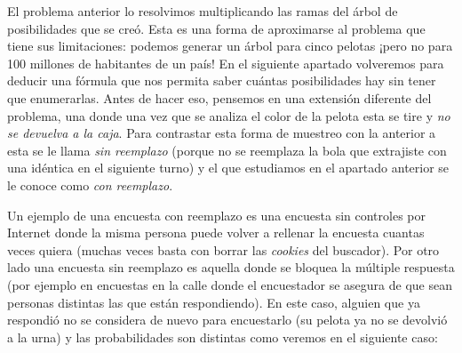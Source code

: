 \documentclass[
]{book}
\begin{document}
El problema anterior lo resolvimos multiplicando las ramas del árbol de posibilidades que se creó. Esta es una forma de aproximarse al problema que tiene sus limitaciones: podemos generar un árbol para cinco pelotas ¡pero no para 100 millones de habitantes de un país! En el siguiente apartado volveremos para deducir una fórmula que nos permita saber cuántas posibilidades hay sin tener que enumerarlas. Antes de hacer eso, pensemos en una extensión diferente del problema, una donde una vez que se analiza el color de la pelota esta se tire y \emph{no se devuelva a la caja}. Para contrastar esta forma de muestreo con la anterior a esta se le llama \emph{sin reemplazo} (porque no se reemplaza la bola que extrajiste con una idéntica en el siguiente turno) y el que estudiamos en el apartado anterior se le conoce como \emph{con reemplazo}.

Un ejemplo de una encuesta con reemplazo es una encuesta sin controles por Internet donde la misma persona puede volver a rellenar la encuesta cuantas veces quiera (muchas veces basta con borrar las \emph{cookies} del buscador). Por otro lado una encuesta sin reemplazo es aquella donde se bloquea la múltiple respuesta (por ejemplo en encuestas en la calle donde el encuestador se asegura de que sean personas distintas las que están respondiendo). En este caso, alguien que ya respondió no se considera de nuevo para encuestarlo (su pelota ya no se devolvió a la urna) y las probabilidades son distintas como veremos en el siguiente caso:
\end{document}
